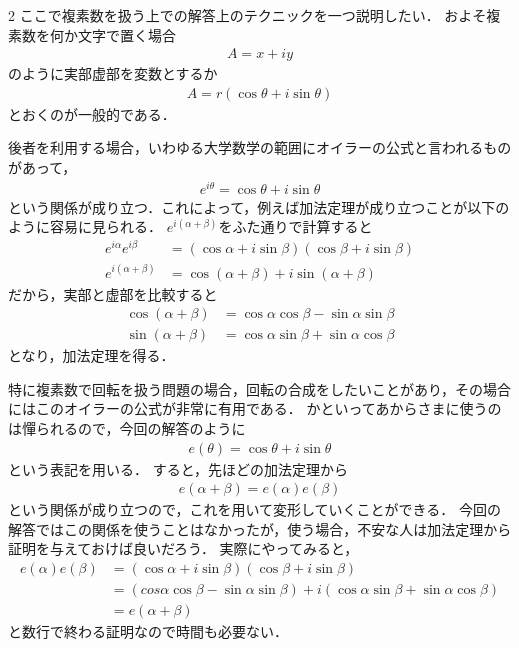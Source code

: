 \documentclass[../../main.tex]{subfiles}
\begin{document}
\begin{multicols}{2}
  ここで複素数を扱う上での解答上のテクニックを一つ説明したい．
  およそ複素数を何か文字で置く場合
  \begin{align*}
    A = x +iy
  \end{align*}
  のように実部虚部を変数とするか
  \begin{align*}
    A = r(\cos\theta + i\sin\theta)
  \end{align*}
  とおくのが一般的である．

  後者を利用する場合，いわゆる大学数学の範囲にオイラーの公式と言われるものがあって，
  \begin{align*}
    e^{i\theta} = \cos\theta + i\sin\theta
  \end{align*}
  という関係が成り立つ．これによって，例えば加法定理が成り立つことが以下のように容易に見られる．
  $e^{i(\alpha+\beta)}$をふた通りで計算すると
  \begin{align*}
    e^{i\alpha}e^{i\beta} & = \left(\cos\alpha+i\sin\beta\right)\left(\cos\beta+i\sin\beta\right) \\
    e^{i(\alpha+\beta)}   & = \cos\left(\alpha+\beta\right) + i\sin\left(\alpha+\beta\right)
  \end{align*}
  だから，実部と虚部を比較すると
  \begin{align*}
    \cos\left(\alpha+\beta\right) & =\cos\alpha\cos\beta - \sin\alpha\sin\beta \\
    \sin\left(\alpha+\beta\right) & =\cos\alpha\sin\beta + \sin\alpha\cos\beta
  \end{align*}
  となり，加法定理を得る．

  特に複素数で回転を扱う問題の場合，回転の合成をしたいことがあり，その場合にはこのオイラーの公式が非常に有用である．
  かといってあからさまに使うのは憚られるので，今回の解答のように
  \begin{align*}
    e(\theta) = \cos\theta + i\sin\theta
  \end{align*}
  という表記を用いる．
  すると，先ほどの加法定理から
  \begin{align*}
    e(\alpha+\beta) = e(\alpha)e(\beta)
  \end{align*}
  という関係が成り立つので，これを用いて変形していくことができる．
  今回の解答ではこの関係を使うことはなかったが，使う場合，不安な人は加法定理から証明を与えておけば良いだろう．
  実際にやってみると，
  \begin{align*}
    e(\alpha)e(\beta)
     & = \left(\cos\alpha+i\sin\beta\right)\left(\cos\beta+i\sin\beta\right)                                             \\
     & = \left(cos\alpha\cos\beta - \sin\alpha\sin\beta\right) + i\left(\cos\alpha\sin\beta + \sin\alpha\cos\beta\right) \\
     & = e(\alpha+\beta)
  \end{align*}
  と数行で終わる証明なので時間も必要ない．

  \newpage
\end{multicols}
\end{document}
